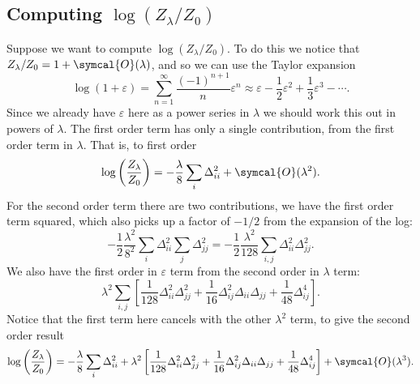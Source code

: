 \documentclass[fleqn]{NotesClass}
\newcommand{\order}{\symcal{O}}
\begin{document}
    \subsection{Computing \texorpdfstring{\(\log(Z_\lambda/Z_0)\)}{log(Zlambda/Z0)}}\label{sec:computing log Zlambda/Z0}
    Suppose we want to compute \(\log(Z_\lambda/Z_0)\).
    To do this we notice that \(Z_\lambda/Z_0 = 1 + \order(\lambda)\), and so we can use the Taylor expansion
    \begin{equation}
        \log(1 + \varepsilon) = \sum_{n = 1}^{\infty} \frac{(-1)^{n + 1}}{n}\varepsilon^n \approx \varepsilon - \frac{1}{2}\varepsilon^2 + \frac{1}{3}\varepsilon^3 - \dotsb.
    \end{equation}
    Since we already have \(\varepsilon\) here as a power series in \(\lambda\) we should work this out in powers of \(\lambda\).
    The first order term has only a single contribution, from the first order term in \(\lambda\).
    That is, to first order
    \begin{equation}
        \log\left( \frac{Z_\lambda}{Z_0} \right) = -\frac{\lambda}{8}\sum_i \Delta_{ii}^2 + \order(\lambda^2).
    \end{equation}
    For the second order term there are two contributions, we have the first order term squared, which also picks up a factor of \(-1/2\) from the expansion of the log:
    \begin{equation}
        -\frac{1}{2} \frac{\lambda^2}{8^2} \sum_{i} \Delta_{ii}^2 \sum_j \Delta_{jj}^2 = -\frac{1}{2} \frac{\lambda^2}{128} \sum_{i, j} \Delta_{ii}^2\Delta_{jj}^2.
    \end{equation}
    We also have the first order in \(\varepsilon\) term from the second order in \(\lambda\) term:
    \begin{equation}
        \lambda^2 \sum_{i,j} \left[ \frac{1}{128}\Delta_{ii}^2\Delta_{jj}^2 + \frac{1}{16} \Delta_{ij}^2\Delta_{ii}\Delta_{jj} + \frac{1}{48}\Delta_{ij}^4 \right].
    \end{equation}
    Notice that the first term here cancels with the other \(\lambda^2\) term, to give the second order result
    \begin{equation}
        \log\left( \frac{Z_\lambda}{Z_0} \right) = -\frac{\lambda}{8} \sum_{i} \Delta_{ii}^2 + \lambda^2 \left[ \frac{1}{128}\Delta_{ii}^2\Delta_{jj}^2 + \frac{1}{16}\Delta_{ij}^2 \Delta_{ii} \Delta_{jj} + \frac{1}{48}\Delta_{ij}^4 \right] + \order(\lambda^3).
    \end{equation}
    
\end{document}
